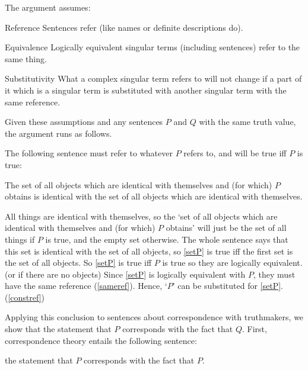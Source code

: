 The argument assumes:
\parencite[753]{Davidson_1969}

	\begin{principle}{Reference}\label{srefer}
	Sentences refer (like names or definite descriptions do).
	\end{principle}

	\begin{principle}{Equivalence}\label{sameref}
	Logically equivalent singular terms (including sentences) refer to the same thing.
	\end{principle}

	\begin{principle}{Substitutivity}\label{constref}
	What a complex singular term refers to will not change if a part of it which is a singular term is substituted with another singular term with the same reference.
	\end{principle}

Given these assumptions and any sentences $P$ and $Q$ with the same truth value, the argument runs as follows.

The following sentence must refer to whatever $P$ refers to, and will be true iff $P$ is true:

	\begin{example}\label{setP}
	The set of all objects which are identical with themselves and (for which) $P$ obtains is identical with the set of all objects which are identical with themselves.
	\end{example}

All things are identical with themselves, so the `set of all objects which are identical with themselves and (for which) $P$ obtains' will just be the set of all things if $P$ is true, and the empty set otherwise.
The whole sentence says that this set is identical with the set of all objects, so \ref{setP} is true iff the first set is the set of all objects.
So \ref{setP} is true iff $P$ is true so they are logically equivalent. (or if there are no objects)
Since \ref{setP} is logically equivalent with $P$, they must have the same reference (\ref{sameref}).
Hence, `$P$' can be substituted for \ref{setP}.
(\ref{constref})

Applying this conclusion to sentences about correspondence with truthmakers, we show that the statement that $P$ corresponds with the fact that $Q$.
First, correspondence theory entails the following sentence:

	\begin{example}\label{stateP}
	the statement that $P$ corresponds with the fact that $P$.
	\end{example}

